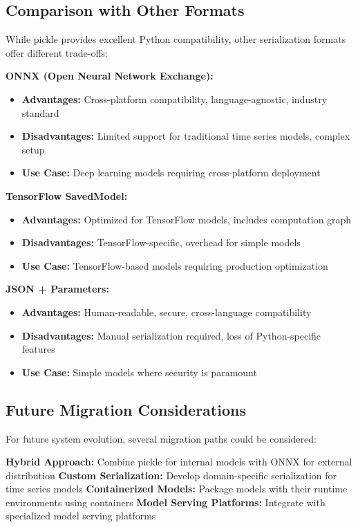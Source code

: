 \subsection{Comparison with Other Formats}

While pickle provides excellent Python compatibility, other serialization formats offer different trade-offs:

\textbf{ONNX (Open Neural Network Exchange):}
\begin{itemize}
\item \textbf{Advantages:} Cross-platform compatibility, language-agnostic, industry standard
\item \textbf{Disadvantages:} Limited support for traditional time series models, complex setup
\item \textbf{Use Case:} Deep learning models requiring cross-platform deployment
\end{itemize}

\textbf{TensorFlow SavedModel:}
\begin{itemize}
\item \textbf{Advantages:} Optimized for TensorFlow models, includes computation graph
\item \textbf{Disadvantages:} TensorFlow-specific, overhead for simple models
\item \textbf{Use Case:} TensorFlow-based models requiring production optimization
\end{itemize}

\textbf{JSON + Parameters:}
\begin{itemize}
\item \textbf{Advantages:} Human-readable, secure, cross-language compatibility
\item \textbf{Disadvantages:} Manual serialization required, loss of Python-specific features
\item \textbf{Use Case:} Simple models where security is paramount
\end{itemize}

\subsection{Future Migration Considerations}

For future system evolution, several migration paths could be considered:

\textbf{Hybrid Approach:} Combine pickle for internal models with ONNX for external distribution
\textbf{Custom Serialization:} Develop domain-specific serialization for time series models
\textbf{Containerized Models:} Package models with their runtime environments using containers
\textbf{Model Serving Platforms:} Integrate with specialized model serving platforms

